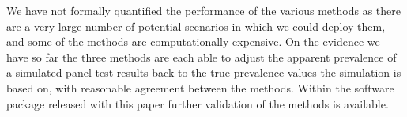 \documentclass[a4paper, 12pt, twoside]{article}
\begin{document}
We have not formally quantified the performance of the various methods as there are a very large number of potential scenarios in which we could deploy them, and some of the methods are computationally expensive. On the evidence we have so far the three methods are each able to adjust the apparent prevalence of a simulated panel test results back to the true prevalence values the simulation is based on, with reasonable agreement between the methods. Within the software package released with this paper further validation of the methods is available.


\end{document}

